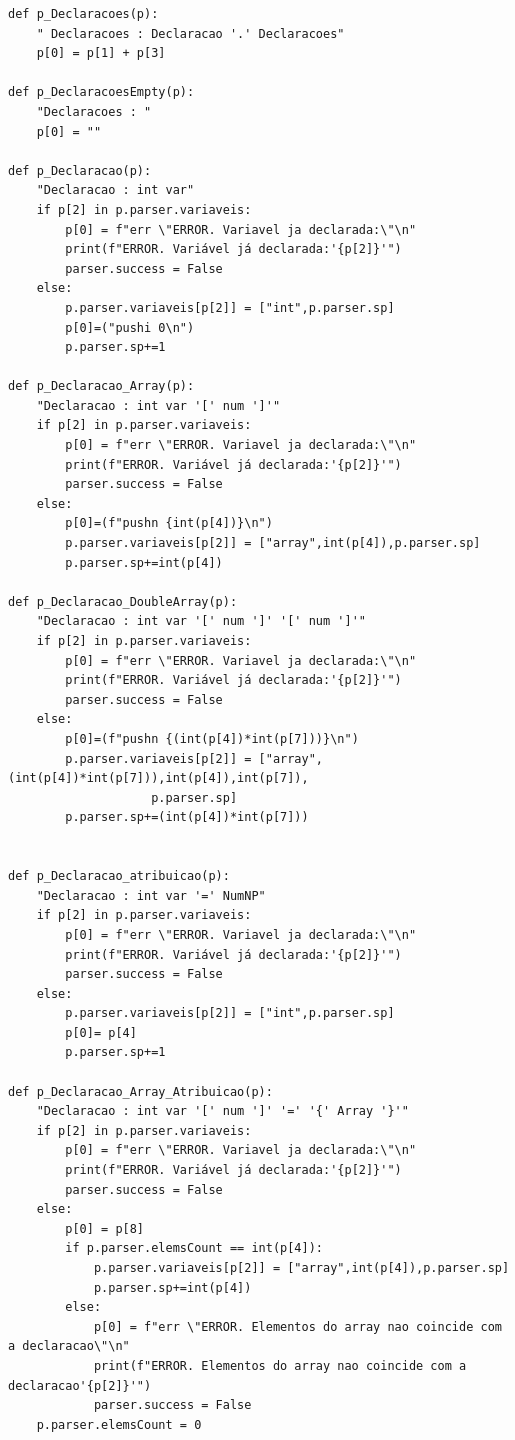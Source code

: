 \documentclass[11pt,a4paper]{report}
\begin{document}
\begin{verbatim}
def p_Declaracoes(p):
    " Declaracoes : Declaracao '.' Declaracoes"
    p[0] = p[1] + p[3]

def p_DeclaracoesEmpty(p):
    "Declaracoes : "
    p[0] = ""

def p_Declaracao(p):
    "Declaracao : int var"
    if p[2] in p.parser.variaveis:
        p[0] = f"err \"ERROR. Variavel ja declarada:\"\n"
        print(f"ERROR. Variável já declarada:'{p[2]}'")
        parser.success = False
    else:
        p.parser.variaveis[p[2]] = ["int",p.parser.sp]
        p[0]=("pushi 0\n")
        p.parser.sp+=1

def p_Declaracao_Array(p):
    "Declaracao : int var '[' num ']'"
    if p[2] in p.parser.variaveis:
        p[0] = f"err \"ERROR. Variavel ja declarada:\"\n"
        print(f"ERROR. Variável já declarada:'{p[2]}'")
        parser.success = False
    else:
        p[0]=(f"pushn {int(p[4])}\n")
        p.parser.variaveis[p[2]] = ["array",int(p[4]),p.parser.sp]
        p.parser.sp+=int(p[4])

def p_Declaracao_DoubleArray(p):
    "Declaracao : int var '[' num ']' '[' num ']'"
    if p[2] in p.parser.variaveis:
        p[0] = f"err \"ERROR. Variavel ja declarada:\"\n"
        print(f"ERROR. Variável já declarada:'{p[2]}'")
        parser.success = False
    else:
        p[0]=(f"pushn {(int(p[4])*int(p[7]))}\n")
        p.parser.variaveis[p[2]] = ["array",(int(p[4])*int(p[7])),int(p[4]),int(p[7]),
					p.parser.sp]
        p.parser.sp+=(int(p[4])*int(p[7]))


def p_Declaracao_atribuicao(p):
    "Declaracao : int var '=' NumNP"
    if p[2] in p.parser.variaveis:
        p[0] = f"err \"ERROR. Variavel ja declarada:\"\n"
        print(f"ERROR. Variável já declarada:'{p[2]}'")
        parser.success = False
    else:
        p.parser.variaveis[p[2]] = ["int",p.parser.sp]
        p[0]= p[4]
        p.parser.sp+=1

def p_Declaracao_Array_Atribuicao(p):
    "Declaracao : int var '[' num ']' '=' '{' Array '}'"
    if p[2] in p.parser.variaveis:
        p[0] = f"err \"ERROR. Variavel ja declarada:\"\n"
        print(f"ERROR. Variável já declarada:'{p[2]}'")
        parser.success = False
    else:
        p[0] = p[8]
        if p.parser.elemsCount == int(p[4]):
            p.parser.variaveis[p[2]] = ["array",int(p[4]),p.parser.sp]
            p.parser.sp+=int(p[4])
        else:
            p[0] = f"err \"ERROR. Elementos do array nao coincide com a declaracao\"\n"
            print(f"ERROR. Elementos do array nao coincide com a declaracao'{p[2]}'")
            parser.success = False
    p.parser.elemsCount = 0



\end{verbatim}
\end{document}
